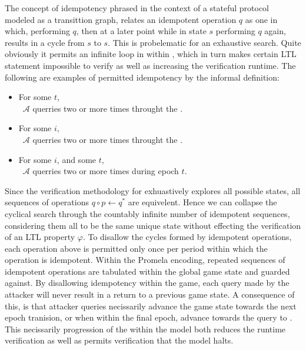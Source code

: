 The concept of idempotency phrased in the context of a stateful protocol modeled as a transittion graph, relates an idempotent operation \(q\) as one in which, performing \(q\), then at a later point while in state \(s\) performing \(q\) again, results in a cycle from \(s\) to \(s\).
This is probelematic for an exhaustive search.
Quite obviously it permits an infinite loop in within \CGKAmod, which in turn makes certain LTL statement impossible to verify as well as increasing the verification runtime.
The following are examples of permitted idempotency by the informal \CGKAsec definition:

\begin{itemize}
  \item For some \(t\),\\~\hspace{4em}\(\mathcal{A}\) querries     two or more times throught the \CGKAsec.  
  \item For some \(i\),\\~\hspace{4em}\(\mathcal{A}\) querries  two or more times throught the \CGKAsec.
  \item For some \(i\), and some \(t\),\\~\hspace{4em}\(\mathcal{A}\) querries  two or more times during epoch \(t\).
\end{itemize}

Since the verification methodology for  exhuastively explores all possible \CGKAsec states, all sequences of operations \(q \circ p \gets q^{*}\) are equivelent.
Hence we can collapse the cyclical search through the countably infinite number of idempotent sequences, considering them all to be the same unique state without effecting the verification of an LTL property \(\varphi\).
To disallow the cycles formed by idempotent operations, each operation above is permitted only once per period within which the operation is idempotent.
Within the \CGKAmod Promela encoding, repeated sequences of idempotent operations are tabulated within the global game state and guarded against.
By disallowing idempotency within the game, each query made by the attacker will never result in a return to a previous game state.
A consequence of this, is that attacker queries necissarily advance the game state towards the next epoch tranision, or when within the final epoch, advance towards the query to .
This necissarily progression of the \CGKAsec within the model  both reduces the runtime verification as well as permits verification that the model  halts.

